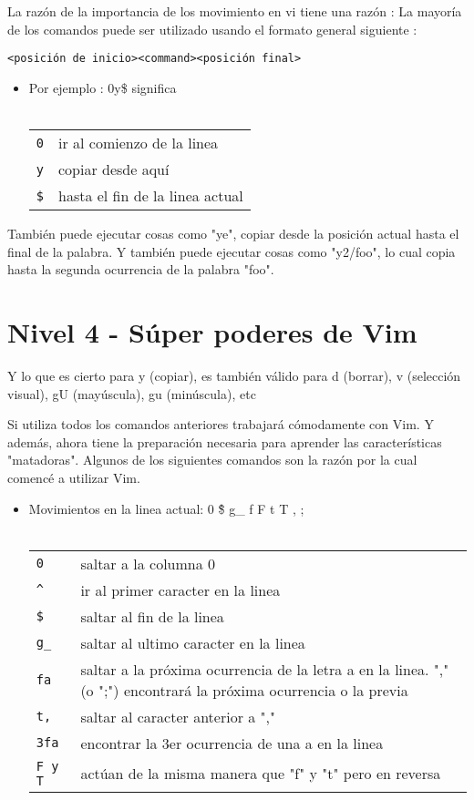 \documentclass[12pt]{article}
\begin{document}
La razón de la importancia de los movimiento en vi tiene una razón :
La mayoría de los comandos puede ser utilizado usando el formato general siguiente :

\texttt{<posición de inicio><command><posición final>}


\begin{itemize}
	\item Por ejemplo : 0y\$ significa \\ \\
\begin{tabular}{ l l }
	\texttt{0} & ir al comienzo de la linea \\
	\texttt{y} & copiar desde aquí \\
	\texttt{\$} & hasta el fin de la linea actual \\
\end{tabular}
\end{itemize}



También puede ejecutar cosas como "ye", copiar desde la posición actual hasta el final de la palabra.
Y también puede ejecutar cosas como "y2/foo", lo cual copia hasta la segunda ocurrencia de la palabra "foo".


\section{Nivel 4 - Súper poderes de Vim}

Y lo que es cierto para y (copiar), es también válido para d (borrar), v (selección visual), gU (mayúscula), gu (minúscula), etc


Si utiliza todos los comandos anteriores trabajará cómodamente con Vim.
Y además, ahora tiene la preparación necesaria para aprender las características "matadoras".
Algunos de los siguientes comandos son la razón por la cual comencé a utilizar Vim.



\begin{itemize}
	\item Movimientos en la linea actual:  0 \^ \$ g\_ f F t T , ; \\ \\
\begin{tabular}{ l l }
	\texttt{0} & saltar a la columna 0 \\
	\texttt{\^} & ir al primer caracter en la linea \\
	\texttt{\$} & saltar al fin de la linea \\
	\texttt{g\_} & saltar al ultimo caracter en la linea \\
	\texttt{fa} & saltar a la próxima ocurrencia de la letra a en la linea. "," (o ";") encontrará la próxima ocurrencia o la previa \\

	\texttt{t,} & saltar al caracter anterior a "," \\
	\texttt{3fa} & encontrar la 3er ocurrencia de una a en la linea \\
	\texttt{F y T} & actúan de la misma manera que "f" y "t" pero en reversa \\
\end{tabular}
\end{itemize}
\end{document}

